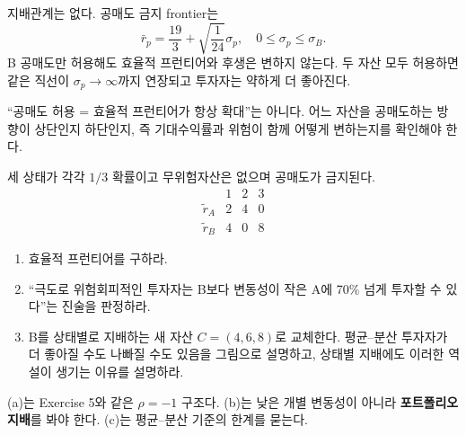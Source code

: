 \begin{answerbox}
지배관계는 없다. 공매도 금지 frontier는
\[
\bar r_p=\frac{19}{3}+\sqrt{\frac1{24}}\sigma_p,\quad0\le\sigma_p\le\sigma_B.
\]
B 공매도만 허용해도 효율적 프런티어와 후생은 변하지 않는다. 두 자산 모두 허용하면 같은 직선이 $\sigma_p\to\infty$까지 연장되고 투자자는 약하게 더 좋아진다.
\end{answerbox}

\begin{warningbox}
``공매도 허용 = 효율적 프런티어가 항상 확대''는 아니다. 어느 자산을 공매도하는 방향이 상단인지 하단인지, 즉 기대수익률과 위험이 함께 어떻게 변하는지를 확인해야 한다.
\end{warningbox}

\begin{officialbox}
세 상태가 각각 $1/3$ 확률이고 무위험자산은 없으며 공매도가 금지된다.
\[
\begin{array}{c|ccc}
&1&2&3\\\hline
\widetilde r_A&2&4&0\\
\widetilde r_B&4&0&8
\end{array}
\]
\begin{enumerate}[label=(\alph*)]
\item 효율적 프런티어를 구하라.
\item ``극도로 위험회피적인 투자자는 B보다 변동성이 작은 A에 70\% 넘게 투자할 수 있다''는 진술을 판정하라.
\item B를 상태별로 지배하는 새 자산 $C=(4,6,8)$로 교체한다. 평균--분산 투자자가 더 좋아질 수도 나빠질 수도 있음을 그림으로 설명하고, 상태별 지배에도 이러한 역설이 생기는 이유를 설명하라.
\end{enumerate}
\end{officialbox}

\begin{strategybox}
(a)는 Exercise 5와 같은 $\rho=-1$ 구조다. (b)는 낮은 개별 변동성이 아니라 \textbf{포트폴리오 지배}를 봐야 한다. (c)는 평균--분산 기준의 한계를 묻는다.
\end{strategybox}


